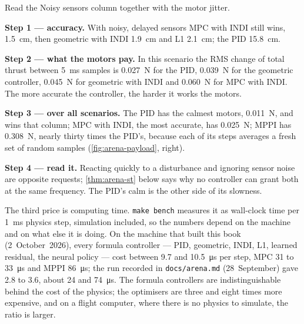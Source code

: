 \begin{example}
\label{ex:arena-noise}
Read the Noisy sensors column together with the motor jitter.

\textbf{Step 1 — accuracy.} With noisy, delayed sensors MPC with INDI still wins, \SI{1.5}{cm}, then geometric with INDI \SI{1.9}{cm} and L1 \SI{2.1}{cm}; the PID \SI{15.8}{cm}.

\textbf{Step 2 — what the motors pay.} In this scenario the RMS change of total thrust between \SI{5}{ms} samples is \SI{0.027}{N} for the PID, \SI{0.039}{N} for the geometric controller, \SI{0.045}{N} for geometric with INDI and \SI{0.060}{N} for MPC with INDI. The more accurate the controller, the harder it works the motors.

\textbf{Step 3 — over all scenarios.} The PID has the calmest motors, \SI{0.011}{N}, and wins that column; MPC with INDI, the most accurate, has \SI{0.025}{N}; MPPI has \SI{0.308}{N}, nearly thirty times the PID's, because each of its steps averages a fresh set of random samples (\cref{fig:arena-payload}, right).

\textbf{Step 4 — read it.} Reacting quickly to a disturbance and ignoring sensor noise are opposite requests; \cref{thm:arena-st} below says why no controller can grant both at the same frequency. The PID's calm is the other side of its slowness.
\end{example}

The third price is computing time. \texttt{make bench} measures it as wall-clock time per \SI{1}{ms} physics step, simulation included, so the numbers depend on the machine and on what else it is doing. On the machine that built this book (2~October~2026), every formula controller — PID, geometric, INDI, L1, learned residual, the neural policy — cost between 9.7 and \SI{10.5}{\micro s} per step, MPC 31 to \SI{33}{\micro s} and MPPI \SI{86}{\micro s}; the run recorded in \texttt{docs/arena.md} (28~September) gave 2.8 to 3.6, about 24 and \SI{74}{\micro s}. The formula controllers are indistinguishable behind the cost of the physics; the optimisers are three and eight times more expensive, and on a flight computer, where there is no physics to simulate, the ratio is larger.

